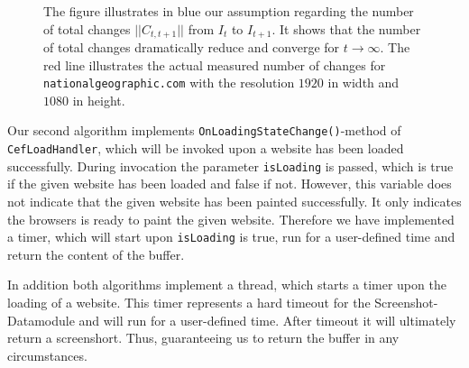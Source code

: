 \begin{figure}
	\centering
	
	\caption[Figure on Total Number of Changes on a Website]{The figure illustrates in blue our assumption regarding the number of total changes $|| C_{t,t+1}||$ from $I_{t}$ to $I_{t+1}$. It shows that the number of total changes dramatically reduce and converge for $t \rightarrow \infty$. The red line illustrates the actual measured number of changes for \texttt{nationalgeographic.com} with the resolution $1920$ in width and $1080$ in height. }
	\label{plot_assumption_number_changes}
\end{figure}

Our second algorithm implements \texttt{OnLoadingStateChange()}-method of \texttt{CefLoadHandler}, which will be invoked upon a website has been loaded successfully. During invocation the parameter \texttt{isLoading} is passed, which is true if the given website has been loaded and false if not. However, this variable does not indicate that the given website has been painted successfully. It only indicates the browsers is ready to paint the given website. Therefore we have implemented a timer, which will start upon \texttt{isLoading} is true, run for a user-defined time and return the content of the buffer.

In addition both algorithms implement a thread, which starts a timer upon the loading of a website. This timer represents a hard timeout for the Screenshot-Datamodule and will run for a user-defined time. After timeout it will ultimately return a screenshort. Thus, guaranteeing us to return the buffer  in any circumstances.

